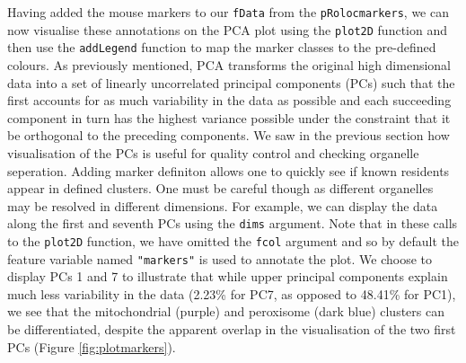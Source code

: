 Having added the mouse markers to our \texttt{fData} from the
\texttt{pRolocmarkers}, we can now visualise these annotations on
the PCA plot using the \texttt{plot2D} function and then use the
\texttt{addLegend} function to map the marker classes to the
pre-defined colours. As previously mentioned, PCA transforms the
original high dimensional data into a set of linearly uncorrelated
principal components (PCs) such that the first accounts for as much
variability in the data as possible and each succeeding component in
turn has the highest variance possible under the constraint that it
be orthogonal to the preceding components. We saw in the previous
section how visualisation of the PCs is useful for quality control and checking
organelle seperation. Adding marker definiton allows one to quickly
see if known residents appear in defined clusters. One must be
careful though as different organelles may be resolved in different
dimensions. For example, we can display the data along the first and
seventh PCs using the \texttt{dims} argument. Note that in these
calls to the \texttt{plot2D} function, we have omitted the
\texttt{fcol} argument and so by default the feature variable named
\texttt{"markers"} is used to annotate the plot. We choose to display PCs 1
and 7 to illustrate that while upper principal components explain
much less variability in the data (2.23\% for PC7, as opposed to
48.41\% for PC1), we see that the mitochondrial (purple) and
peroxisome (dark blue) clusters can be differentiated, despite the
apparent overlap in the visualisation of the two first PCs (Figure
\ref{fig:plotmarkers}). 

